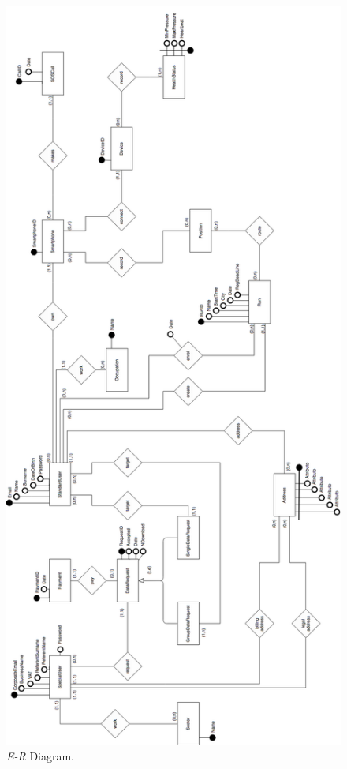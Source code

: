 \begin{figure}[H]
  \begin{center}
  	\includegraphics[height=0.68\paperheight]{./img/ER.png}
    \hspace{0.05\linewidth}
    \centering
    \caption{\textit{E-R} Diagram.}
		\label{img:ER_Diagram}
    \end{center}
\end{figure}

